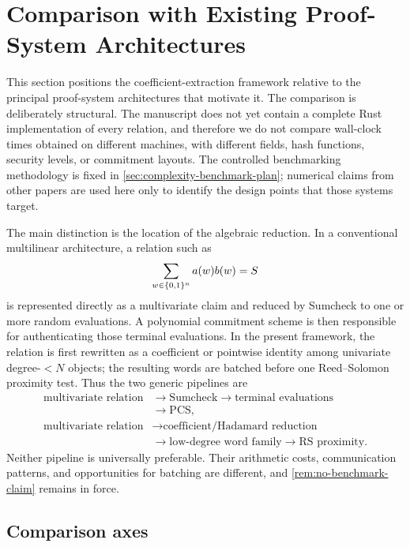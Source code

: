 \section{Comparison with Existing Proof-System Architectures}
\label{sec:comparison}

This section positions the coefficient-extraction framework relative to the principal proof-system architectures that motivate it.  The comparison is deliberately structural.  The manuscript does not yet contain a complete Rust implementation of every relation, and therefore we do not compare wall-clock times obtained on different machines, with different fields, hash functions, security levels, or commitment layouts.  The controlled benchmarking methodology is fixed in \cref{sec:complexity-benchmark-plan}; numerical claims from other papers are used here only to identify the design points that those systems target.

The main distinction is the location of the algebraic reduction.  In a conventional multilinear architecture, a relation such as
\[
  \sum_{w\in\{0,1\}^n} a(w)b(w)=S
\]
is represented directly as a multivariate claim and reduced by Sumcheck to one or more random evaluations.  A polynomial commitment scheme is then responsible for authenticating those terminal evaluations.  In the present framework, the relation is first rewritten as a coefficient or pointwise identity among univariate degree-$<N$ objects; the resulting words are batched before one Reed--Solomon proximity test.  Thus the two generic pipelines are
\begin{equation}
\begin{aligned}
  \text{multivariate relation}
  &\longrightarrow \text{Sumcheck}
   \longrightarrow \text{terminal evaluations}
  \\
  &\longrightarrow \text{PCS},
  \\[0.4ex]
  \text{multivariate relation}
  &\longrightarrow \text{coefficient/Hadamard reduction}
  \\
  &\longrightarrow \text{low-degree word family}
   \longrightarrow \text{RS proximity}.
\end{aligned}
\label{eq:comparison-two-pipelines}
\end{equation}
Neither pipeline is universally preferable.  Their arithmetic costs, communication patterns, and opportunities for batching are different, and \cref{rem:no-benchmark-claim} remains in force.

\subsection{Comparison axes}
\label{sec:comparison-axes}

